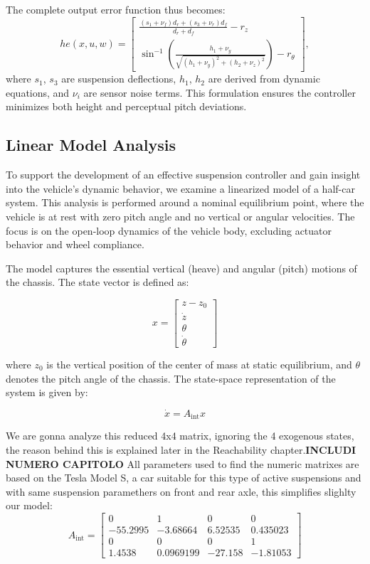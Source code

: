 \documentclass[]{report}
\begin{document}
The complete output error function thus becomes:
\[
he(x, u, w) =
\begin{bmatrix}
	\displaystyle \frac{(s_1 + \nu_f) d_r + (s_3 + \nu_r) d_f}{d_r + d_f} - r_z \\
	\displaystyle \sin^{-1}\left( \frac{h_1 + \nu_y}{\sqrt{(h_1 + \nu_y)^2 + (h_2 + \nu_z)^2}} \right) - r_\theta
\end{bmatrix},
\]
where $s_1$, $s_3$ are suspension deflections, $h_1$, $h_2$ are derived from dynamic equations, and $\nu_i$ are sensor noise terms. This formulation ensures the controller minimizes both height and perceptual pitch deviations.


\subsection{Linear Model Analysis}

To support the development of an effective suspension controller and gain insight into the vehicle's dynamic behavior, we examine a linearized model of a half-car system. This analysis is performed around a nominal equilibrium point, where the vehicle is at rest with zero pitch angle and no vertical or angular velocities. The focus is on the open-loop dynamics of the vehicle body, excluding actuator behavior and wheel compliance.

The model captures the essential vertical (heave) and angular (pitch) motions of the chassis. The state vector is defined as:

\[
x = \begin{bmatrix}
	z - z_0 \\
	\dot{z} \\
	\theta \\
	\dot{\theta}
\end{bmatrix}
\]

where \( z_0 \) is the vertical position of the center of mass at static equilibrium, and \( \theta \) denotes the pitch angle of the chassis. The state-space representation of the system is given by:

\[
\dot{x} = A_{\text{int}} x
\]

We are gonna analyze this reduced 4x4 matrix, ignoring the 4 exogenous states, the reason behind this is explained later in the Reachability chapter.\textbf{INCLUDI NUMERO CAPITOLO}  All parameters used to find the numeric matrixes are based on the Tesla Model S, a car suitable for this type of active suspensions and with same suspension paramethers on front and rear axle, this simplifies slighlty our model:
\[
A_{\text{int}} =
\begin{bmatrix}
	0 & 1 & 0 & 0 \\
	-55.2995 & -3.68664 & 6.52535 & 0.435023 \\
	0 & 0 & 0 & 1 \\
	1.4538 & 0.0969199 & -27.158 & -1.81053 
\end{bmatrix}
\]
\end{document}
